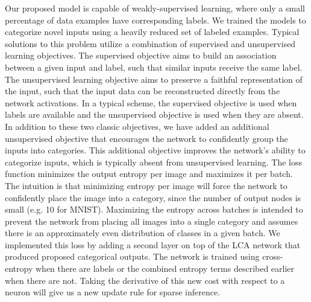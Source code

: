Our proposed model is capable of weakly-supervised learning, where only a small percentage of data examples have corresponding labels. We trained the models to categorize novel inputs using a heavily reduced set of labeled examples. Typical solutions to this problem utilize a combination of supervised and unsupervised learning objectives. The supervised objective aims to build an association between a given input and label, such that similar inputs receive the same label. The unsupervised learning objective aims to preserve a faithful representation of the input, such that the input data can be reconstructed directly from the network activations. In a typical scheme, the supervised objective is used when labels are available and the unsupervised objective is used when they are absent. In addition to these two classic objectives, we have added an additional unsupervised objective that encourages the network to confidently group the inputs into categories. This additional objective improves the network’s ability to categorize inputs, which is typically absent from unsupervised learning. The loss function minimizes the output entropy per image and maximizes it per batch. The intuition is that minimizing entropy per image will force the network to confidently place the image into a category, since the number of output nodes is small (e.g. 10 for MNIST). Maximizing the entropy across batches is intended to prevent the network from placing all images into a single category and assumes there is an approximately even distribution of classes in a given batch. We implemented this loss by adding a second layer on top of the LCA network that produced proposed categorical outputs. The network is trained using cross-entropy when there are labels or the combined entropy terms described earlier when there are not. Taking the derivative of this new cost with respect to a neuron will give us a new update rule for sparse inference.


